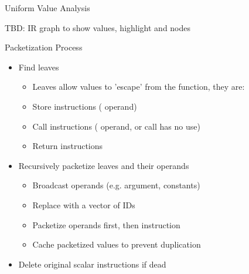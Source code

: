 
\begin{frame}{Uniform Value Analysis}

TBD: IR graph to show values, highlight  and  nodes

\end{frame}


\begin{frame}{Packetization Process}

\begin{itemize}
    \item Find leaves
    \begin{itemize}
        \item Leaves allow  values to 'escape' from the function, they are:
        \item Store instructions ( operand)
        \item Call instructions ( operand, or call has no use)
        \item Return instructions
    \end{itemize}
\end{itemize}

\begin{itemize}
    \item Recursively packetize leaves and their operands
    \begin{itemize}
        \item Broadcast  operands (e.g. argument, constants)
        \item Replace  with a vector of IDs
        \item Packetize operands first, then instruction
        \item Cache packetized values to prevent duplication
    \end{itemize}
\end{itemize}

\begin{itemize}
    \item Delete original scalar instructions if dead
\end{itemize}

\end{frame}


